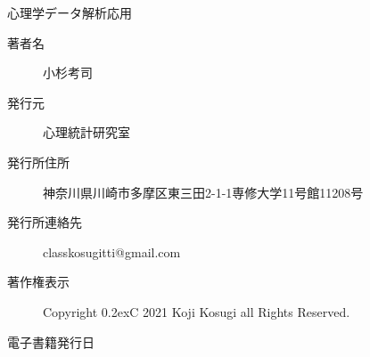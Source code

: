 

\vspace*{20pt}
\begin{center}
	\Large{心理学データ解析応用}

	\vspace*{20pt}

	\large{}

	\large{}

	\vspace*{20pt}

	\begin{description}
		\item[著者名] 小杉考司
		\item[発行元] 心理統計研究室
		\item[発行所住所] 神奈川県川崎市多摩区東三田2-1-1専修大学11号館11208号
		\item[発行所連絡先] classkosugitti@gmail.com
		\item[著作権表示] Copyright \raise0.2ex\hbox{\textcircled{\scriptsize{C}}} 2021 Koji Kosugi all Rights Reserved.
		\item[電子書籍発行日] \date{\today}
	\end{description}
\end{center}

